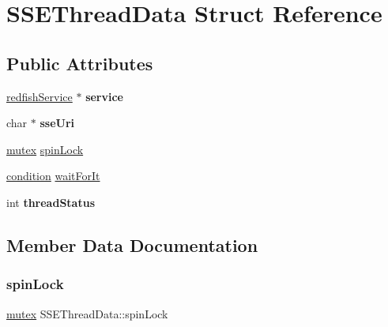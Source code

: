 \hypertarget{structSSEThreadData}{}\section{S\+S\+E\+Thread\+Data Struct Reference}
\label{structSSEThreadData}
\subsection*{Public Attributes}
\begin{DoxyCompactItemize}
\item 
\mbox{\label{structSSEThreadData_a299ff33bd377a09bfe2431a704cdb564}} 
\hyperlink{redfishService_8h_a4c9115c0f0a21de971c0dfae06f26372}{redfish\+Service} $\ast$ {\bfseries service}
\item 
\mbox{\label{structSSEThreadData_a369af81bf9f3b1b213a41ba91721e1c6}} 
char $\ast$ {\bfseries sse\+Uri}
\item 
\hyperlink{queue_8h_a8c80af1d72030a9dc70c3a2c3e46ae9a}{mutex} \hyperlink{structSSEThreadData_ae1b47add8bc39707e7687a5c15f6facb}{spin\+Lock}
\item 
\hyperlink{queue_8h_a18a0de1af5a8524b75bf94d6b14701b4}{condition} \hyperlink{structSSEThreadData_a2c1ad330fd390938be8ef292fee4df82}{wait\+For\+It}
\item 
\mbox{\label{structSSEThreadData_a0ecd819cdec9284f732976a863cb975a}} 
int {\bfseries thread\+Status}
\end{DoxyCompactItemize}


\subsection{Member Data Documentation}
\mbox{\label{structSSEThreadData_ae1b47add8bc39707e7687a5c15f6facb}} 
\subsubsection{\texorpdfstring{spin\+Lock}{spinLock}}
{\footnotesize\ttfamily \hyperlink{queue_8h_a8c80af1d72030a9dc70c3a2c3e46ae9a}{mutex} S\+S\+E\+Thread\+Data\+::spin\+Lock}

